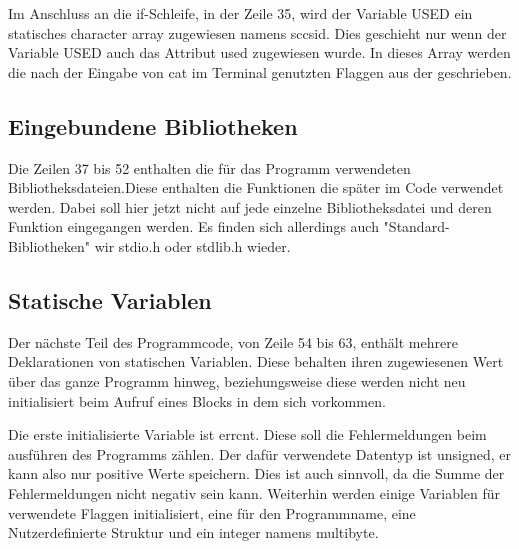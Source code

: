 {Im Anschluss an die if-Schleife, in der Zeile 35, wird der Variable USED ein statisches character array zugewiesen namens sccsid. Dies geschieht nur wenn der Variable USED auch das Attribut used zugewiesen wurde. In dieses Array werden die nach der Eingabe von cat im Terminal genutzten Flaggen aus der geschrieben.

\subsection{Eingebundene Bibliotheken}
Die Zeilen 37 bis 52 enthalten die für das Programm verwendeten Bibliotheksdateien.Diese enthalten die Funktionen die später im Code verwendet werden. Dabei soll hier jetzt nicht auf jede einzelne Bibliotheksdatei und deren Funktion eingegangen werden. Es finden sich allerdings auch "Standard-Bibliotheken" wir stdio.h oder stdlib.h wieder.

\subsection{Statische Variablen}
Der nächste Teil des Programmcode, von Zeile 54 bis 63, enthält mehrere Deklarationen von statischen Variablen. Diese behalten ihren zugewiesenen Wert über das ganze Programm hinweg, beziehungsweise diese  werden nicht neu initialisiert beim Aufruf eines Blocks in dem sich vorkommen. \par
Die erste initialisierte Variable ist errcnt. Diese soll die Fehlermeldungen beim ausführen des Programms zählen. Der dafür verwendete Datentyp ist unsigned, er kann also nur positive Werte speichern. Dies ist auch sinnvoll, da die Summe der Fehlermeldungen nicht negativ sein kann. \pari
Weiterhin werden einige Variablen für verwendete Flaggen initialisiert, eine für den Programmname, eine Nutzerdefinierte Struktur und ein integer namens multibyte.\par

}
